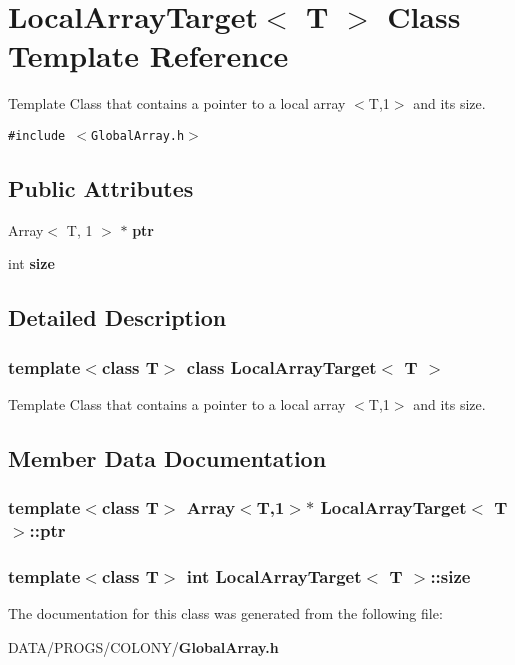 \section{LocalArrayTarget$<$ T $>$ Class Template Reference}
\label{classLocalArrayTarget}
Template Class that contains a pointer to a local array $<$T,1$>$ and its size.  


{\tt \#include $<$GlobalArray.h$>$}

\subsection*{Public Attributes}
\begin{CompactItemize}
\item 
Array$<$ T, 1 $>$ $\ast$ {\bf ptr}
\item 
int {\bf size}
\end{CompactItemize}


\subsection{Detailed Description}
\subsubsection*{template$<$class T$>$ class LocalArrayTarget$<$ T $>$}

Template Class that contains a pointer to a local array $<$T,1$>$ and its size. 

\subsection{Member Data Documentation}
\subsubsection{\setlength{\rightskip}{0pt plus 5cm}template$<$class T$>$ Array$<$T,1$>$$\ast$ {\bf LocalArrayTarget}$<$ T $>$::{\bf ptr}}\label{classLocalArrayTarget_3b29598eb841c0a02f411ab264d004c5}


\subsubsection{\setlength{\rightskip}{0pt plus 5cm}template$<$class T$>$ int {\bf LocalArrayTarget}$<$ T $>$::{\bf size}}\label{classLocalArrayTarget_86568f7d95eb26314a5856799071dc2e}




The documentation for this class was generated from the following file:\begin{CompactItemize}
\item 
DATA/PROGS/COLONY/{\bf GlobalArray.h}\end{CompactItemize}
